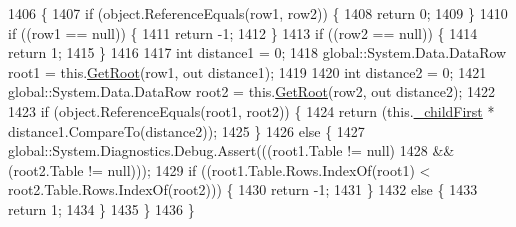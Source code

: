 \begin{DoxyCode}
1406                                                                                                \{
1407                 \textcolor{keywordflow}{if} (\textcolor{keywordtype}{object}.ReferenceEquals(row1, row2)) \{
1408                     \textcolor{keywordflow}{return} 0;
1409                 \}
1410                 \textcolor{keywordflow}{if} ((row1 == null)) \{
1411                     \textcolor{keywordflow}{return} -1;
1412                 \}
1413                 \textcolor{keywordflow}{if} ((row2 == null)) \{
1414                     \textcolor{keywordflow}{return} 1;
1415                 \}
1416 
1417                 \textcolor{keywordtype}{int} distance1 = 0;
1418                 global::System.Data.DataRow root1 = this.\hyperlink{class_proyecto___integrador__3_1_1ds_servicios_table_adapters_1_1_table_adapter_manager_1_1_self_reference_comparer_a9bf53ee3bb97ad3fc23f5d885290e9b4}{GetRoot}(row1, out distance1);
1419 
1420                 \textcolor{keywordtype}{int} distance2 = 0;
1421                 global::System.Data.DataRow root2 = this.\hyperlink{class_proyecto___integrador__3_1_1ds_servicios_table_adapters_1_1_table_adapter_manager_1_1_self_reference_comparer_a9bf53ee3bb97ad3fc23f5d885290e9b4}{GetRoot}(row2, out distance2);
1422 
1423                 \textcolor{keywordflow}{if} (\textcolor{keywordtype}{object}.ReferenceEquals(root1, root2)) \{
1424                     \textcolor{keywordflow}{return} (this.\hyperlink{class_proyecto___integrador__3_1_1ds_servicios_table_adapters_1_1_table_adapter_manager_1_1_self_reference_comparer_abf5fed6c245e5ee78cd5472bac96e77e}{\_childFirst} * distance1.CompareTo(distance2));
1425                 \}
1426                 \textcolor{keywordflow}{else} \{
1427                     global::System.Diagnostics.Debug.Assert(((root1.Table != null) 
1428                                     && (root2.Table != null)));
1429                     \textcolor{keywordflow}{if} ((root1.Table.Rows.IndexOf(root1) < root2.Table.Rows.IndexOf(root2))) \{
1430                         \textcolor{keywordflow}{return} -1;
1431                     \}
1432                     \textcolor{keywordflow}{else} \{
1433                         \textcolor{keywordflow}{return} 1;
1434                     \}
1435                 \}
1436             \}
\end{DoxyCode}
